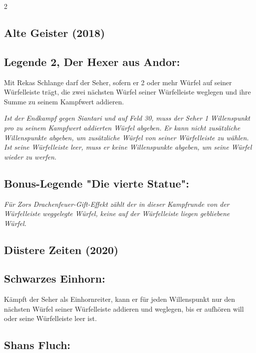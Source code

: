 \documentclass[10pt, a4paper, oneside]{book}
\newcommand{\fan}[1]{\textit{#1}}
\begin{document}
\begin{multicols*}{2}
\begin{bgcolor}[color-ag]
\section{Alte Geister (2018)}



\subsection{Legende 2, Der Hexer aus Andor:}

Mit Rekas Schlange darf der Seher, sofern er 2 oder mehr Würfel auf seiner Würfelleiste trägt, die zwei nächsten Würfel seiner Würfelleiste weglegen und ihre Summe zu seinem Kampfwert addieren.
\supercite{ag-begleitheft}

\fan{Ist der Endkampf gegen Siantari und auf Feld 30, muss der Seher 1 Willenspunkt pro zu seinem Kampfwert addierten Würfel abgeben. Er kann nicht zusätzliche Willenspunkte abgeben, um zusätzliche Würfel von seiner Würfelleiste zu wählen. Ist seine Würfelleiste leer, muss er keine Willenspunkte abgeben, um seine Würfel wieder zu werfen.}

\subsection{Bonus-Legende "Die vierte Statue":}

\fan{Für Zors Drachenfeuer-Gift-Effekt zählt der in dieser Kampfrunde von der Würfelleiste weggelegte Würfel, keine auf der Würfelleiste liegen gebliebene Würfel.}


\end{bgcolor}



\begin{bgcolor}[color-dz]
\section{Düstere Zeiten (2020)}


\subsection{Schwarzes Einhorn:}

Kämpft der Seher als Einhornreiter, kann er für jeden Willenspunkt nur den nächsten Würfel seiner Würfelleiste addieren und weglegen, bis er aufhören will oder seine Würfelleiste leer ist.
\supercite{dz-begleitheft}



\subsection{Shans Fluch:}


\end{bgcolor}
\end{multicols*}
\end{document}
